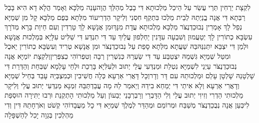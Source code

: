 \documentclass[../main/main.tex]{subfiles}
\begin{document}
\begin{multicols*}{\ncols}
לִקְצָת יַרְחִין תְּרֵי עֲשַׂר עַל הֵיכַל מַלְכוּתָא דִּי בָבֶל מְהַלֵּךְ הֲוָה\PreVerseSpace{}עָנֵה מַלְכָּא וְאָמַר הֲלָא דָא הִיא בָּבֶל רַבְּתָא דִּי אֲנָה בֱנַיְתַהּ לְבֵית מַלְכוּ בִּתְקַף חִסְנִי וְלִיקָר הַדְרִי\PreVerseSpace{}עוֹד מִלְּתָא בְּפֻם מַלְכָּא קָל מִן שְׁמַיָּא נְפַל לָךְ אָמְרִין נְבוּכַדְנֶצֹּר מַלְכָּא מַלְכוּתָא עֲדָת מִנָּךְ\PreVerseSpace{}וּמִן אֲנָשָׁא לָךְ טָרְדִין וְעִם חֵיוַת בָּרָא מְדֹרָךְ עִשְׂבָּא כְתוֹרִין לָךְ יְטַעֲמוּן וְשִׁבְעָה עִדָּנִין יַחְלְפוּן עֲלַיִךְ עַד דִּי תִנְדַּע דִּי שַׁלִּיט עִלָּיָא בְּמַלְכוּת אֲנָשָׁא וּלְמַן דִּי יִצְבֵּא יִתְּנִנַּהּ\PreVerseSpace{}בַּהּ שַׁעֲתָא מִלְּתָא סָפַת עַל נְבוּכַדְנֶצֹּר וּמִן אֲנָשָׁא טְרִיד וְעִשְׂבָּא כְתוֹרִין יֵאכֻל וּמִטַּל שְׁמַיָּא גִּשְׁמֵהּ יִצְטַבַּע עַד דִּי שַׂעְרֵהּ כְּנִשְׁרִין רְבָה וְטִפְרוֹהִי כְצִפְּרִין\PreVerseSpace{}וְלִקְצָת יוֹמַיָּא אֲנָה נְבוּכַדְנֶצֹּר עַיְנַי לִשְׁמַיָּא נִטְלֵת וּמַנְדְּעִי עֲלַי יְתוּב וּלְעִלִּיָא בָּרְכֵת וּלְחַי עָלְמָא שַׁבְּחֵת וְהַדְּרֵת דִּי שָׁלְטָנֵהּ שָׁלְטָן עָלַם וּמַלְכוּתֵהּ עִם דָּר וְדָר\PreVerseSpace{}וְכָל דָּאֲרִי אַרְעָא כְּלָה חֲשִׁיבִין וּכְמִצְבְּיֵהּ עָבֵד בְּחֵיל שְׁמַיָּא וְדָאֲרִי אַרְעָא וְלָא אִיתַי דִּי יְמַחֵא בִידֵהּ וְיֵאמַר לֵהּ מָה עֲבַדְתְּ\PreVerseSpace{}בֵּהּ זִמְנָא מַנְדְּעִי יְתוּב עֲלַי וְלִיקָר מַלְכוּתִי הַדְרִי וְזִיוִי יְתוּב עֲלַי וְלִי הַדָּבְרַי וְרַבְרְבָנַי יְבַעוֹן וְעַל מַלְכוּתִי הָתְקְנֵת\SubEnd{} וּרְבוּ יַתִּירָה הוּסְפַת לִי\PreVerseSpace{}כְּעַן אֲנָה נְבֻכַדְנֶצֹּר מְשַׁבַּח וּמְרוֹמֵם וּמְהַדַּר לְמֶלֶךְ שְׁמַיָּא דִּי כָל מַעֲבָדוֹהִי קְשֹׁט וְאֹרְחָתֵהּ דִּין וְדִי מַהְלְכִין בְּגֵוָה יָכִל לְהַשְׁפָּלָה\OpenSection{}\par

\end{multicols*}
\end{document}
